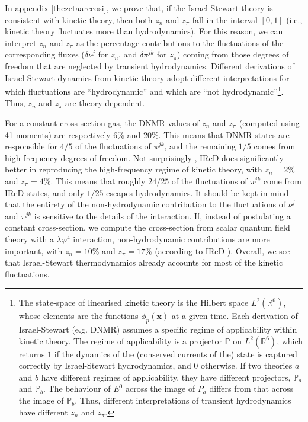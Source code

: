 \documentclass[aps,prd,preprint,nofootinbib,amsmath,amssymb,showpacs,longbibliography,singlecolumn,superscriptaddress,10pt]{revtex4-1}
\theoremstyle{plain}
\theoremstyle{definition}
\begin{document}
In appendix \ref{thezetaarecosi}, we prove that, if the Israel-Stewart theory is consistent with kinetic theory, then both $z_n$ and $z_\pi$ fall in the interval $[0,1]$ (i.e., kinetic theory fluctuates more than hydrodynamics). For this reason, we can interpret $z_n$ and $z_\pi$ as the percentage contributions to the fluctuations of the corresponding fluxes ($\delta \nu^j$ for $z_n$, and $\delta \pi^{jk}$ for $z_\pi$) coming from those degrees of freedom that are neglected by transient hydrodynamics. Different derivations of Israel-Stewart dynamics from kinetic theory adopt different interpretations for which fluctuations are ``hydrodynamic'' and which are ``not hydrodynamic''\footnote{The state-space of linearised kinetic theory is the Hilbert space $L^2(\mathbb{R}^6)$, whose elements are the functions $\phi_p(\textbf{x})$ at a given time. Each derivation of Israel-Stewart (e.g. DNMR) assumes a specific regime of applicability within kinetic theory. The regime of applicability is a projector $\mathbb{P}$ on $L^2(\mathbb{R}^6)$, which returns $1$ if the dynamics of the (conserved currents of the) state is captured correctly by Israel-Stewart hydrodynamics, and $0$ otherwise. If two theories $a$ and $b$ have different regimes of applicability, they have different projectors, $\mathbb{P}_a$ and $\mathbb{P}_b$. The behaviour of $E^0$ across the image of $P_a$ differs from that across the image of $\mathbb{P}_b$. Thus, different interpretations of transient hydrodynamics have different $z_n$ and $z_\pi$.}. Thus, $z_n$ and $z_\pi$ are theory-dependent. 

For a constant-cross-section gas, the DNMR \cite{Denicol:2012cn} values of $z_n$ and $z_\pi$ (computed using 41 moments) are respectively 6\% and 20\%. This means that DNMR states are responsible for $4/5$ of the fluctuations of $\pi^{jk}$, and the remaining $1/5$ comes from high-frequency degrees of freedom. Not surprisingly \cite{Wagner:2023jgq}, IReD \cite{Wagner:2022ayd} does significantly better in reproducing the high-frequency regime of kinetic theory, with $z_n=2$\% and $z_\pi=4$\%. This means that roughly $24/25$ of the fluctuations of $\pi^{jk}$ come from IReD states, and only $1/25$ escapes hydrodynamics. It should be kept in mind that the entirety of the non-hydrodynamic contribution to the fluctuations of $\nu^j$ and $\pi^{jk}$ is sensitive to the details of the interaction. If, instead of postulating a constant cross-section, we compute the cross-section from scalar quantum field theory with a $\lambda\varphi^4$ interaction, non-hydrodynamic contributions are more important, with $z_n=10$\% and $z_\pi=17$\% (according to IReD \cite{Rocha:2023hts}). Overall, we see that Israel-Stewart thermodynamics already accounts for most of the kinetic fluctuations. 
\end{document}
